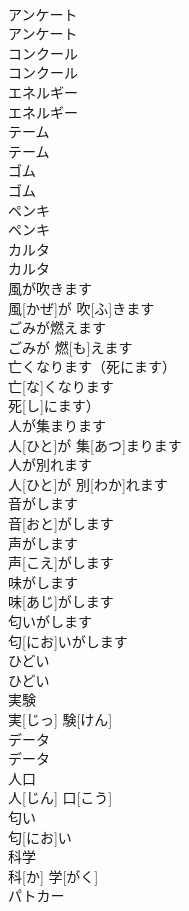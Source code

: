 \documentclass[8pt]{extreport}
\begin{document}
\begin{CJK}{UTF8}{min}
\\	アンケート	
\\	アンケート		
\\	コンクール	
\\	コンクール		
\\	エネルギー	
\\	エネルギー		
\\	テーム	
\\	テーム		
\\	ゴム	
\\	ゴム		
\\	ペンキ	
\\	ペンキ		
\\	カルタ	
\\	カルタ		
\\	風が吹きます	
\\	風[かぜ]が 吹[ふ]きます		
\\	ごみが燃えます	
\\	ごみが 燃[も]えます		
\\	亡くなります（死にます）	
\\	亡[な]くなります
\\	死[し]にます）		
\\	人が集まります	
\\	人[ひと]が 集[あつ]まります		
\\	人が別れます	
\\	人[ひと]が 別[わか]れます		
\\	音がします	
\\	音[おと]がします		
\\	声がします	
\\	声[こえ]がします		
\\	味がします	
\\	味[あじ]がします		
\\	匂いがします	
\\	匂[にお]いがします		
\\	ひどい	
\\	ひどい		
\\	実験	
\\	実[じっ] 験[けん]		
\\	データ	
\\	データ		
\\	人口	
\\	人[じん] 口[こう]		
\\	匂い	
\\	匂[にお]い		
\\	科学	
\\	科[か] 学[がく]		
\\	パトカー	

\end{CJK}
\end{document}

